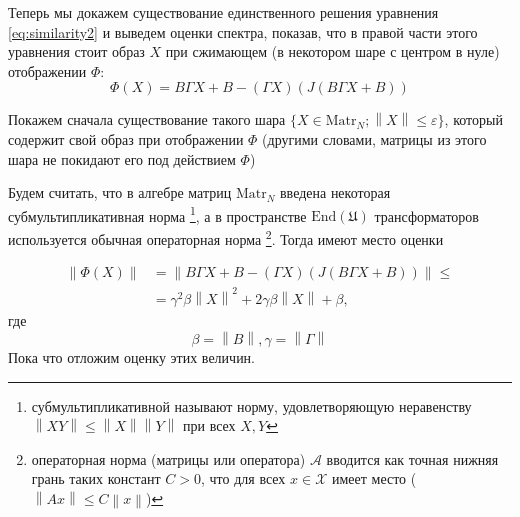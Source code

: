 Теперь мы докажем существование единственного решения уравнения \eqref{eq:similarity2}
и выведем оценки спектра,
показав, что в правой части этого уравнения стоит образ \( X \)
при сжимающем (в некотором шаре с центром в нуле) отображении \( \Phi \):
\[ \Phi(X) = B \Gamma X + B - (\Gamma X) (J(B\Gamma X + B)) \]

Покажем сначала существование такого шара \( \{ X\in\mathrm{Matr}_{N}; {\left\|X\right\|} \leq \varepsilon \} \),
который содержит свой образ при отображении \( \Phi \)
(другими словами, матрицы из этого шара
 не покидают его под действием \( \Phi \))

Будем считать, что в алгебре матриц \( \mathrm{Matr}_{N} \)
введена некоторая субмультипликативная норма%
\footnote{субмультипликативной называют норму, удовлетворяющую неравенству \( {\left\|XY\right\|}\leq {\left\|X\right\|}{\left\|Y\right\|} \) при всех \( X, Y \) },
а в пространстве \( \mathrm{End}\left({\mathfrak U}\right) \) трансформаторов
используется обычная операторная норма%
\footnote{операторная норма
(матрицы или оператора) \( \mathcal A \)
вводится как точная нижняя грань таких констант \( C > 0 \),
что для всех \( x\in\mathscr X\) имеет место
(\( {\left\|A x\right\|} \leq C {\left\|x\right\|} \))}.
Тогда имеют место оценки

\begin{align*}
    {\left\|\Phi(X)\right\|} &= {\left\|B \Gamma X + B - (\Gamma X) (J(B\Gamma X + B))\right\|} \leq \\
    &= \gamma^2\beta{\left\|X\right\|}^2 + 2\gamma\beta{\left\|X\right\|} + \beta,
\end{align*}
где \[ \beta={\left\|B\right\|}, \gamma={\left\|\Gamma\right\|} \]
Пока что отложим оценку этих величин.

